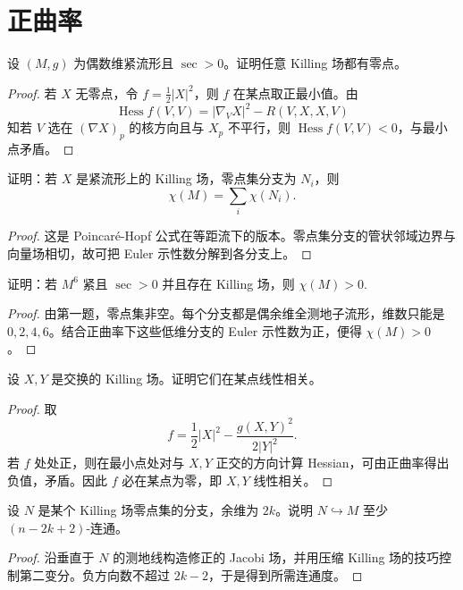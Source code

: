 \documentclass[11pt,a4paper,openany]{ctexbook}
\numberwithin{equation}{chapter}
\begin{document}
\section{正曲率}

\begin{problem}
设 \((M,g)\) 为偶数维紧流形且 \(\sec>0\)。证明任意 Killing 场都有零点。
\end{problem}
\begin{proof}
若 \(X\) 无零点，令 \(f=\frac12|X|^2\)，则 \(f\) 在某点取正最小值。由
\[
\operatorname{Hess}f(V,V)=|\nabla_VX|^2-R(V,X,X,V)
\]
知若 \(V\) 选在 \((\nabla X)_p\) 的核方向且与 \(X_p\) 不平行，则 \(\operatorname{Hess}f(V,V)<0\)，与最小点矛盾。
\end{proof}

\begin{problem}
证明：若 \(X\) 是紧流形上的 Killing 场，零点集分支为 \(N_i\)，则
\[
\chi(M)=\sum_i\chi(N_i).
\]
\end{problem}
\begin{proof}
这是 Poincaré-Hopf 公式在等距流下的版本。零点集分支的管状邻域边界与向量场相切，故可把 Euler 示性数分解到各分支上。
\end{proof}

\begin{problem}
证明：若 \(M^6\) 紧且 \(\sec>0\) 并且存在 Killing 场，则 \(\chi(M)>0\).
\end{problem}
\begin{proof}
由第一题，零点集非空。每个分支都是偶余维全测地子流形，维数只能是 \(0,2,4,6\)。结合正曲率下这些低维分支的 Euler 示性数为正，便得 \(\chi(M)>0\)。
\end{proof}

\begin{problem}
设 \(X,Y\) 是交换的 Killing 场。证明它们在某点线性相关。
\end{problem}
\begin{proof}
取
\[
f=\frac12|X|^2-\frac{g(X,Y)^2}{2|Y|^2}.
\]
若 \(f\) 处处正，则在最小点处对与 \(X,Y\) 正交的方向计算 Hessian，可由正曲率得出负值，矛盾。因此 \(f\) 必在某点为零，即 \(X,Y\) 线性相关。
\end{proof}

\begin{problem}
设 \(N\) 是某个 Killing 场零点集的分支，余维为 \(2k\)。说明 \(N\hookrightarrow M\) 至少 \((n-2k+2)\)-连通。
\end{problem}
\begin{proof}
沿垂直于 \(N\) 的测地线构造修正的 Jacobi 场，并用压缩 Killing 场的技巧控制第二变分。负方向数不超过 \(2k-2\)，于是得到所需连通度。
\end{proof}
\end{document}
